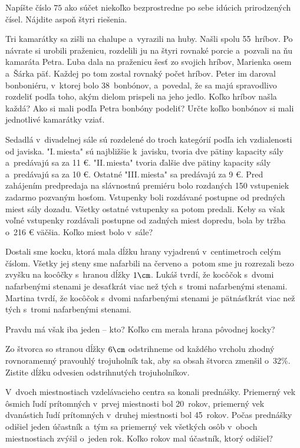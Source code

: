 {%
Napíšte číslo $75$ ako súčet niekoľko bezprostredne po sebe idúcich prirodzených čísel. Nájdite aspoň štyri riešenia.}

{%
Tri kamarátky sa zišli na chalupe a~vyrazili na huby. Našli spolu 55~hríbov. Po návrate si urobili praženicu, rozdelili ju na štyri rovnaké porcie a~pozvali na ňu kamaráta Petra. Ľuba dala na praženicu šesť zo svojich hríbov, Marienka osem a~Šárka päť. Každej po tom zostal rovnaký počet hríbov. Peter im daroval bonboniéru, v~ktorej bolo 38~bonbónov, a~povedal, že sa majú spravodlivo rozdeliť podľa toho, akým dielom prispeli na jeho jedlo.
 Koľko hríbov našla každá?
 Ako si mali podľa Petra bonbóny podeliť? Určte koľko bonbónov si mali jednotlivé kamarátky vziať.
}

{%
Sedadlá v~divadelnej sále sú rozdelené do troch kategórií podľa ich vzdialenosti od javiska. "I.\,miesta" sú najbližšie k~javisku, tvoria dve pätiny kapacity sály a~predávajú sa za 11 €. "II.\,miesta" tvoria ďalšie dve pätiny kapacity sály a~predávajú sa za 10 €. Ostatné "III.\,miesta"  sa predávajú za 9 €. Pred zahájením predpredaja na slávnostnú premiéru bolo rozdaných 150 vstupeniek zadarmo pozvaným hosťom. Vstupenky boli rozdávané postupne od predných miest sály dozadu. Všetky ostatné vstupenky sa potom predali. Keby sa však voľné vstupenky rozdávali postupne od zadných miest dopredu, bola by tržba o~216 € väčšia. Koľko miest bolo v~sále?
}

{%
Dostali sme kocku, ktorá mala dĺžku hrany vyjadrenú v~centimetroch celým číslom. Všetky jej steny sme nafarbili na červeno a~potom sme ju rozrezali bezo zvyšku na kocôčky s~hranou dĺžky $1\cm$. 
\itemitem{$\bullet$} Lukáš tvrdí, že kocôčok s~dvomi nafarbenými stenami je desaťkrát viac než tých s~tromi nafarbenými stenami.
\itemitem{$\bullet$} Martina tvrdí, že kocôčok s~dvomi nafarbenými stenami je pätnásťkrát viac než tých s~tromi nafarbenými stenami.

\noindent
Pravdu má však iba jeden -- kto? Koľko cm merala hrana pôvodnej kocky?
}

{%
Zo štvorca so stranou dĺžky $6\cm$ odstrihneme od každého vrcholu zhodný rovnoramenný pravouhlý trojuholník tak, aby sa obsah štvorca zmenšil o~32\%. Zistite dĺžku odvesien odstrihnutých trojuholníkov.}

{%
V~dvoch miestnostiach vzdelávacieho centra sa konali prednášky. Priemerný vek ôsmich ľudí prítomných v~prvej miestnosti bol 20~rokov, priemerný vek dvanástich ľudí prítomných v~druhej miestnosti bol 45~rokov. Počas prednášky odišiel jeden účastník a~tým sa priemerný vek všetkých osôb v~oboch miestnostiach zvýšil o~jeden rok. Koľko rokov mal účastník, ktorý odišiel?}

